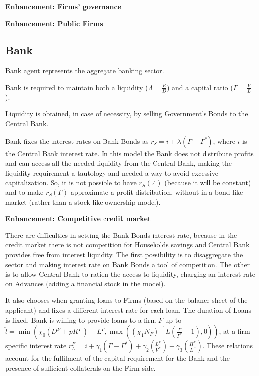 \documentclass[a4paper, headings=standardclasses]{scrartcl}
\newenvironment{enh}[1][]{\begin{framed}\noindent\textbf{Enhancement: #1}\par}{\end{framed}}
\begin{document}
\begin{enh}[Firms' governance]

\end{enh}

\begin{enh}[Public Firms]
\end{enh}


\subsection{Bank}
Bank agent represents the aggregate banking sector.

Bank is required to maintain both a liquidity ($\Lambda = \frac{R}{D}$) and a capital ratio ($\Gamma = \frac{V}{L}$).

Liquidity is obtained, in case of necessity, by selling Government's Bonds to the Central Bank.

Bank fixes the interest rates on Bank Bonds as $r_S = i + \lambda(\Gamma - \Gamma^*)$, where $i$ is the Central Bank interest rate. In this model the Bank does not distribute profits and can access all the needed liquidity from the Central Bank, making the liquidity requirement a tautology and needed a way to avoid excessive capitalization. So, it is not possible to have $r_S(\Lambda)$ (because it will be constant) and to make $r_S(\Gamma)$ approximate a profit distribution, without in a bond-like market (rather than a stock-like ownership model).

\begin{enh}[Competitive credit market]
	There are difficulties in setting the Bank Bonds interest rate, because in the credit market there is not competition for Households savings and Central Bank provides free from interest liquidity.
	The first possibility is to disaggregate the sector and making interest rate on Bank Bonds a tool of competition.
	The other is to allow Central Bank to ration the access to liquidity, charging an interest rate on Advances (adding a financial stock in the model).
\end{enh}

It also chooses when granting loans to Firms (based on the balance sheet of the applicant) and fixes a different interest rate for each loan. The duration of Loans is fixed.
Bank is willing to provide loans to a firm $F$ up to $\hat{l} = \min (\chi_0 (D^F+pK^F) - L^F, \max((\chi_1 N_F)^{-1} L (\frac{\Gamma}{\Gamma^*}-1),0))$, at a firm-specific interest rate $r_L^F = i + \gamma_1 (\Gamma - \Gamma^*) + \gamma_2 (\frac{L^F}{V^F}) - \gamma_3 (\frac{\Pi^F}{L^F})$.
These relations account for the fulfilment of the capital requirement for the Bank and the presence of sufficient collaterals on the Firm side.
\end{document}
